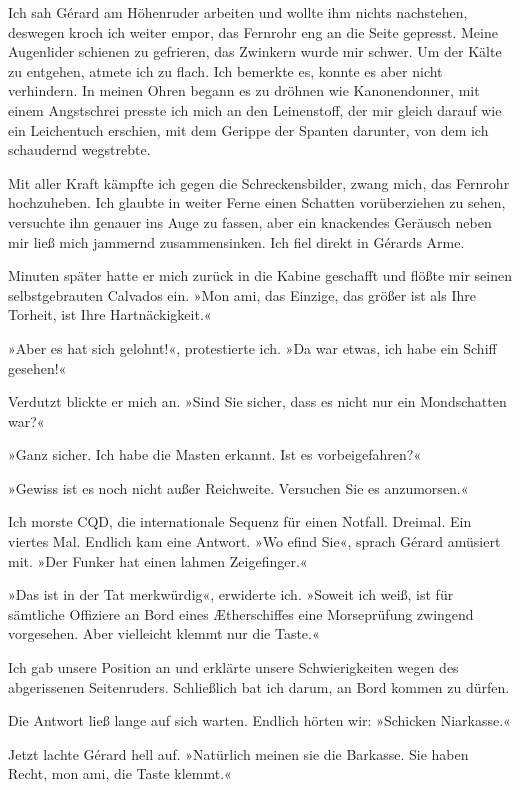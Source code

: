 Ich sah Gérard am Höhenruder arbeiten und wollte ihm nichts
nachstehen, deswegen kroch ich weiter empor, das Fernrohr eng an
die Seite gepresst. Meine Augenlider schienen zu gefrieren, das
Zwinkern wurde mir schwer. Um der Kälte zu entgehen, atmete ich zu
flach. Ich bemerkte es, konnte es aber nicht verhindern. In meinen
Ohren begann es zu dröhnen wie Kanonendonner, mit einem Angstschrei
presste ich mich an den Leinenstoff, der mir gleich darauf wie ein
Leichentuch erschien, mit dem Gerippe der Spanten darunter, von dem
ich schaudernd wegstrebte.

Mit aller Kraft kämpfte ich gegen die Schreckensbilder, zwang mich,
das Fernrohr hochzuheben. Ich glaubte in weiter Ferne einen
Schatten vorüberziehen zu sehen, versuchte ihn genauer ins Auge zu
fassen, aber ein knackendes Geräusch neben mir ließ mich jammernd
zusammensinken. Ich fiel direkt in Gérards Arme.

Minuten später hatte er mich zurück in die Kabine geschafft und
flößte mir seinen selbstgebrauten Calvados ein. »Mon ami, das
Einzige, das größer ist als Ihre Torheit, ist Ihre
Hartnäckigkeit.«

»Aber es hat sich gelohnt!«, protestierte ich. »Da war etwas, ich
habe ein Schiff gesehen!«

Verdutzt blickte er mich an. »Sind Sie sicher, dass es nicht nur
ein Mondschatten war?«

»Ganz sicher. Ich habe die Masten erkannt. Ist es vorbeigefahren?«

»Gewiss ist es noch nicht außer Reichweite. Versuchen Sie es
anzumorsen.«

Ich morste CQD, die internationale Sequenz für einen Notfall.
Dreimal. Ein viertes Mal. Endlich kam eine Antwort. »Wo efind Sie«,
sprach Gérard amüsiert mit. »Der Funker hat einen lahmen
Zeigefinger.«

»Das ist in der Tat merkwürdig«, erwiderte ich. »Soweit ich weiß,
ist für sämtliche Offiziere an Bord eines Ætherschiffes eine
Morseprüfung zwingend vorgesehen. Aber vielleicht klemmt nur die
Taste.«

Ich gab unsere Position an und erklärte unsere Schwierigkeiten
wegen des abgerissenen Seitenruders. Schließlich bat ich darum, an
Bord kommen zu dürfen.

Die Antwort ließ lange auf sich warten. Endlich hörten wir:
»Schicken Niarkasse.«

Jetzt lachte Gérard hell auf. »Natürlich meinen sie die Barkasse.
Sie haben Recht, mon ami, die Taste klemmt.«


